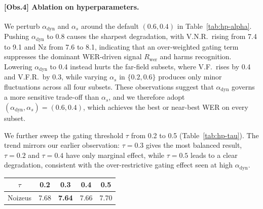 \documentclass{llmxive}
\begin{document}
\vspace{-2mm}
\paragraph{\textbf{[Obs.4] Ablation on hyperparameters.}}
We perturb $\alpha_{\text{dyn}}$ and $\alpha_s$ around the default $(0.6, 0.4)$ in Table~\ref{tab:hp-alpha}. Pushing $\alpha_{\text{dyn}}$ to 0.8 causes the sharpest degradation, with V.N.R.\ rising from 7.4 to 9.1 and Nz from 7.6 to 8.1, indicating that an over-weighted gating term suppresses the dominant WER-driven signal $R_{\text{wer}}$ and harms recognition. Lowering $\alpha_{\text{dyn}}$ to 0.4 instead hurts the far-field subsets, where V.F.\ rises by 0.4 and V.F.R.\ by 0.3, while varying $\alpha_s$ in $\{0.2, 0.6\}$ produces only minor fluctuations across all four subsets. These observations suggest that $\alpha_{\text{dyn}}$ governs a more sensitive trade-off than $\alpha_s$, and we therefore adopt $(\alpha_{\text{dyn}}, \alpha_s){=}(0.6, 0.4)$, which achieves the best or near-best WER on every subset.

\vspace{-2mm}
\begin{minipage}[c]{0.55\textwidth}
We further sweep the gating threshold $\tau$ from 0.2 to 0.5 (Table~\ref{tab:hp-tau}). The trend mirrors our earlier observation: $\tau{=}0.3$ gives the most balanced result, $\tau{=}0.2$ and $\tau{=}0.4$ have only marginal effect, while $\tau{=}0.5$ leads to a clear degradation, consistent with the over-restrictive gating effect seen at high $\alpha_{\text{dyn}}$.
\end{minipage}%
\hfill
\begin{minipage}[c]{0.42\textwidth}
\centering
\vspace{-2mm}
\label{tab:hp-tau}
\small
\setlength{\tabcolsep}{6pt}
\begin{tabular}{ccccc}
\toprule
$\tau$ & 0.2 & \textbf{0.3} & 0.4 & 0.5 \\
\midrule
Noizeus & 7.68 & \textbf{7.64} & 7.66 & 7.70 \\
\bottomrule
\end{tabular}
\end{minipage}


\end{document}
